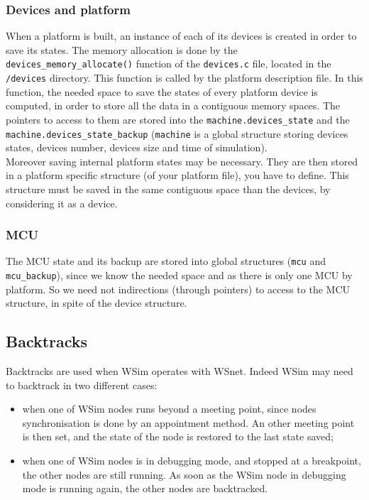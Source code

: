 \documentclass[a4paper,10pt]{report}
\begin{document}
\subsubsection{Devices and platform}
When a platform is built, an instance of each of its devices is created in order to save its states. The memory allocation  is done by the \verb$devices_memory_allocate()$ function of the \verb$devices.c$ file, located in the \verb$/devices$ directory. This function is called by the platform description file. In this function, the needed space to save the states of every platform device is computed, in order to store all the data in a contiguous memory spaces.  The pointers to access to them are stored into the \verb$machine.devices_state$ and the \verb$machine.devices_state_backup$ (\verb$machine$ is a global structure storing devices states, devices number, devices size and time of simulation).\\

Moreover saving internal platform states may be necessary. They are then stored in a platform specific structure (of your platform file), you have to define. This structure must be saved in the same contiguous space than the devices, by considering it as a device.

\subsubsection{MCU}
The MCU state and its backup are stored into global structures (\verb$mcu$ and \verb$mcu_backup$), since we know the needed space and as there is only one MCU by platform. So we need not indirections (through pointers) to access to the MCU structure, in spite of the device structure.

\subsection{Backtracks}
Backtracks are used when WSim operates with WSnet. Indeed WSim may need to backtrack in two different cases:
\begin{itemize}
  \item when one of WSim nodes runs beyond a meeting point, since nodes synchronisation is done by an appointment method. An other meeting point is then set, and the state of the node is restored to the last state saved;
  \item when one of WSim nodes is in debugging mode, and stopped at a breakpoint, the other nodes are still running. As soon as the WSim node in debugging mode is running again, the other nodes are backtracked.
\end{itemize}
\end{document}
